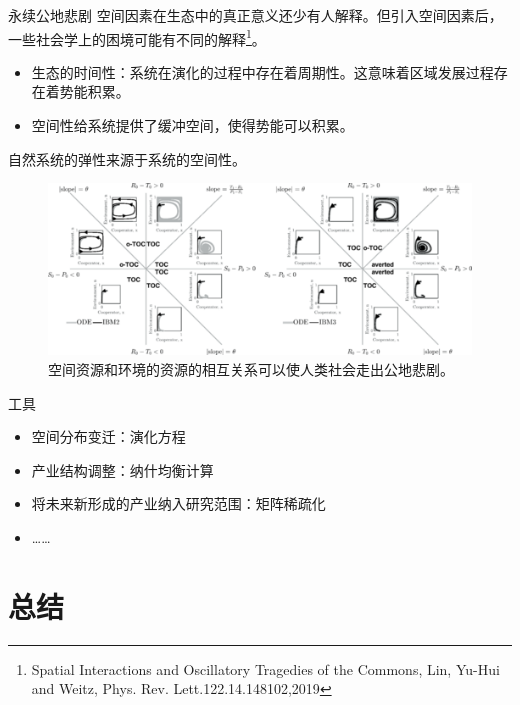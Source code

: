 \documentclass[utf8]{ctexbeamer}
\begin{document}
\begin{frame}{永续公地悲剧}
    空间因素在生态中的真正意义还少有人解释。但引入空间因素后，一些社会学上的困境可能有不同的解释\footnote{Spatial Interactions and Oscillatory Tragedies of the Commons, Lin, Yu-Hui and Weitz, Phys. Rev. Lett.122.14.148102,2019}。
    \begin{itemize}
        \item 生态的时间性：系统在演化的过程中存在着周期性。这意味着区域发展过程存在着势能积累。
        \item 空间性给系统提供了缓冲空间，使得势能可以积累。
    \end{itemize}
    自然系统的弹性来源于系统的空间性。
    \begin{figure}
        \centering
        \includegraphics[width = 0.6\linewidth]{图片/toc.png}
        \caption{空间资源和环境的资源的相互关系可以使人类社会走出公地悲剧。}
    \end{figure}
\end{frame}

\begin{frame}{工具}
    \begin{itemize}
        \item 空间分布变迁：演化方程
        \item 产业结构调整：纳什均衡计算
        \item 将未来新形成的产业纳入研究范围：矩阵稀疏化
        \item ……
    \end{itemize}
\end{frame}

\section{总结}
\end{document}
